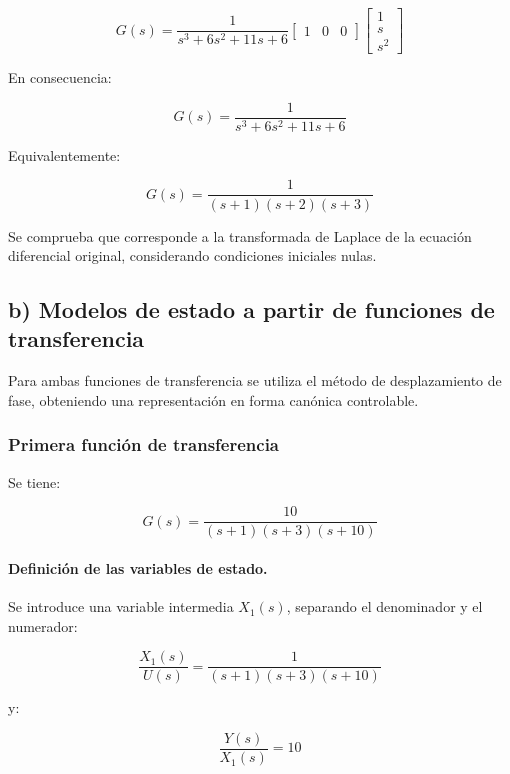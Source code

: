 \documentclass[12pt,a4paper]{article}
\begin{document}
\begin{equation}G(s)=\frac{1}{s^3+6s^2+11s+6} \begin{bmatrix}1&0&0\end{bmatrix} \begin{bmatrix}1\\s\\s^2\end{bmatrix}\end{equation}

En consecuencia:

\begin{equation}\boxed{G(s)=\frac{1}{s^3+6s^2+11s+6}}\end{equation}

Equivalentemente:

\begin{equation}\boxed{G(s)=\frac{1}{(s+1)(s+2)(s+3)}}\end{equation}

Se comprueba que corresponde a la transformada de Laplace de la ecuación diferencial original, considerando condiciones iniciales nulas.
\subsection*{b) Modelos de estado a partir de funciones de transferencia}
Para ambas funciones de transferencia se utiliza el método de desplazamiento de fase, obteniendo una representación en forma canónica controlable.
\subsubsection*{Primera función de transferencia}
Se tiene:

\begin{equation}G(s)=\frac{10}{(s+1)(s+3)(s+10)}\end{equation}
\paragraph{Definición de las variables de estado.} Se introduce una variable intermedia $X_1(s)$, separando el denominador y el numerador:

\begin{equation}\frac{X_1(s)}{U(s)}=\frac{1}{(s+1)(s+3)(s+10)}\end{equation}

y:

\begin{equation}\frac{Y(s)}{X_1(s)}=10\end{equation}
\end{document}
